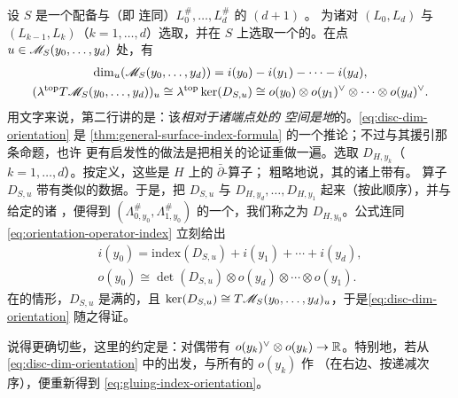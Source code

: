 设 $S$ 是一个配备\trStriplikeEnd{}与\trBrane\trLabel{}（即\trLagrange\trLabel{}
连同\trBraneStructure）$L^{\#}_0,\ldots,L^{\#}_d$ 的 $(d{+}1)$ \trPointedDisc。
为诸对 $(L_0,L_d)$ 与 $(L_{k-1},L_k)$（$k=1,\ldots,d$）选取\trFloerDatum，并在
$S$ 上选取一个\trCompatible{}的\trPerturbationDatum。在\trRegular{}点
$u\in\mathscr{M}_S(y_0,\ldots,y_d)$ 处，有
\begin{equation}\label{eq:disc-dim-orientation}
\begin{gathered}
\dim_u(\mathscr{M}_S(y_0,\ldots,y_d))=i(y_0)-i(y_1)-\cdots-i(y_d),\\
(\lambda^{\mathrm{top}}T\mathscr{M}_S(y_0,\ldots,y_d))_u
\cong\lambda^{\mathrm{top}}\ker(D_{S,u})
\cong o(y_0)\otimes o(y_1)^{\vee}\otimes\cdots\otimes o(y_d)^{\vee}.
\end{gathered}
\end{equation}
用文字来说，第二行讲的是：该\trModuliSpace{}\emph{相对于诸端点处的\trOrientation{}
空间是\trCanonical{}地\trOrientation}的。\eqref{eq:disc-dim-orientation} 是%
\cref{thm:general-surface-index-formula} 的一个推论；不过与其援引那条命题，也许
更有启发性的做法是把相关的\trGluing{}论证重做一遍。选取\trOrientationOperator{}
$D_{H,y_k}$（$k=1,\ldots,d$）。按定义，这些是 $H$ 上的 $\bar\partial$-算子；
粗略地说，其\trBoundaryCondition{}的诸\trSubbundle{}上带有\trBraneStructure。
\trLinearization{}算子 $D_{S,u}$ 带有类似的数据。于是，把 $D_{S,u}$ 与
$D_{H,y_d},\ldots,D_{H,y_1}$ \trGluing{}起来（按此顺序），并与给定的诸%
\trBraneStructure{}\trCompatible，便得到 $(\Lambda^{\#}_{0,y_0},\Lambda^{\#}_{1,y_0})$
的一个\trOrientationOperator，我们称之为 $D_{H,y_0}$。\trGluing{}公式连同
\eqref{eq:orientation-operator-index} 立刻给出
\begin{equation}\label{eq:gluing-index-orientation}
\begin{gathered}
i(y_0)=\mathrm{index}(D_{S,u})+i(y_1)+\cdots+i(y_d),\\
o(y_0)\cong\det(D_{S,u})\otimes o(y_d)\otimes\cdots\otimes o(y_1).
\end{gathered}
\end{equation}
在\trRegular{}的情形，$D_{S,u}$ 是满的，且 $\ker(D_{S,u})\cong
T\mathscr{M}_S(y_0,\ldots,y_d)_u$，于是\eqref{eq:disc-dim-orientation} 随之得证。
\begin{remark}\label{thm:dual-pairing-remark}
说得更确切些，这里的约定是：对偶带有\trCanonical\trPairing{}
$o(y_k)^{\vee}\otimes o(y_k)\to\mathbb{R}$。特别地，若从
\eqref{eq:disc-dim-orientation} 中的\trIsomorphism{}出发，与所有的 $o(y_k)$ 作%
\trTensorProduct{}（在右边、按递减次序），便重新得到
\eqref{eq:gluing-index-orientation}。
\end{remark}
